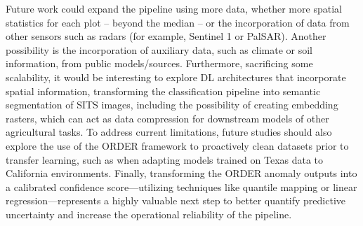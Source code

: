 Future work could expand the pipeline using more data, whether more spatial statistics for each plot – beyond the median – or the incorporation of data from other sensors such as radars (for example, Sentinel 1 or PalSAR). Another possibility is the incorporation of auxiliary data, such as climate or soil information, from public models/sources. Furthermore, sacrificing some scalability, it would be interesting to explore DL architectures that incorporate spatial information, transforming the classification pipeline into semantic segmentation of SITS images, including the possibility of creating embedding rasters, which can act as data compression for downstream models of other agricultural tasks. To address current limitations, future studies should also explore the use of the \ac{ORDER} framework to proactively clean datasets prior to transfer learning, such as when adapting models trained on Texas data to California environments. Finally, transforming the \ac{ORDER} anomaly outputs into a calibrated confidence score—utilizing techniques like quantile mapping or linear regression—represents a highly valuable next step to better quantify predictive uncertainty and increase the operational reliability of the pipeline.